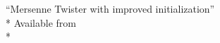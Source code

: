 \documentclass[letterpaper,12pt]{article}
\begin{document}
\begin{thebibliography}{99}

\begin{samepage}
  ``Mersenne Twister with improved initialization''\\*
  Available from\\*
\end{samepage}







\end{thebibliography}
\end{document}
